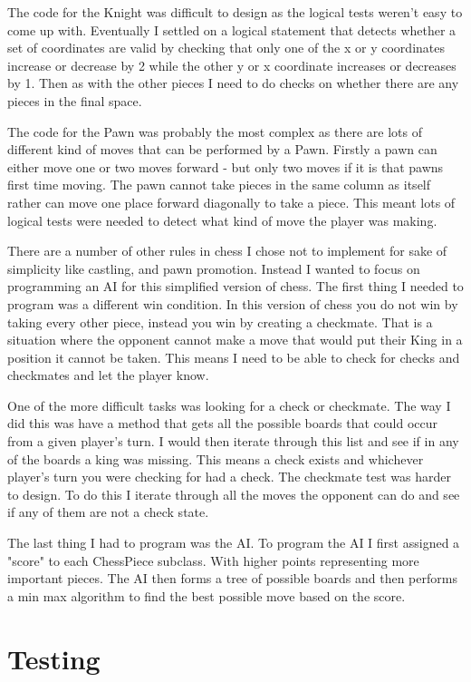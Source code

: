 \documentclass[a4paper]{article}
\begin{document}
The code for the Knight was difficult to design as the logical tests weren't easy to come up with. Eventually I settled on a logical statement that detects whether a set of coordinates are valid by checking that only one of the x or y coordinates increase or decrease by 2 while the other y or x coordinate increases or decreases by 1. Then as with the other pieces I need to do checks on whether there are any pieces in the final space.

The code for the Pawn was probably the most complex as there are lots of different kind of moves that can be performed by a Pawn.  Firstly a pawn can either move one or two moves forward - but only two moves if it is that pawns first time moving. The pawn cannot take pieces in the same column as itself rather can move one place forward diagonally to take a piece. This meant lots of logical tests were needed to detect what kind of move the player was making.

There are a number of other rules in chess I chose not to implement for sake of simplicity like castling, and pawn promotion. Instead I wanted to focus on programming an AI for this simplified version of chess. The first thing I needed to program was a different win condition. In this version of chess you do not win by taking every other piece, instead you win by creating a checkmate. That is a situation where the opponent cannot make a move that would put their King in a position it cannot be taken. This means I need to be able to check for checks  and checkmates and let the player know.

One of the more difficult tasks was looking for a check or checkmate. The way I did this was have a method that gets all the possible boards that could occur from a given player's turn. I would then iterate through this list and see if in any of the boards a king was missing. This means a check exists and whichever player's turn you were checking for had a check. The checkmate test was harder to design. To do this I iterate through all the moves the opponent can do and see if any of them are not a check state.

The last thing I had to program was the AI. To program the AI I first assigned a "score" to each ChessPiece subclass. With higher points representing more important pieces. The AI then forms a tree of possible boards and then performs a min max algorithm to find the best possible move based on the score.

\section*{Testing}
\end{document}
